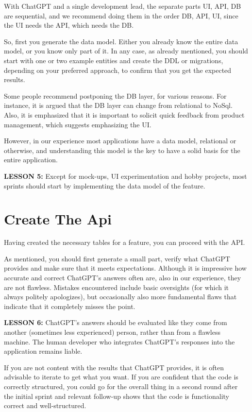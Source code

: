 \documentclass[runningheads]{llncs}
\begin{document}
With ChatGPT and a single development lead, the separate parts UI, API, DB are sequential, and we recommend doing them in the order DB, API, UI, since the UI needs the API, which needs the DB.

So, first you generate the data model. Either you already know the entire data model, or you know only part of it. In any case, as already mentioned, you should start with one or two example entities and create the DDL or migrations, depending on your preferred approach, to confirm that you get the expected results.

Some people recommend postponing the DB layer, for various reasons. For instance, it is argued that the DB layer can change from relational to NoSql. Also, it is emphasized that it is important to solicit quick feedback from product management, which suggests emphasizing the UI.

However, in our experience most applications have a data model, relational or otherwise, and understanding this model is the key to have a solid basis for the entire application.

\textbf{LESSON 5:} Except for mock-ups, UI experimentation and hobby projects, most sprints should start by implementing the data model of the feature.

\section{Create The Api}
Having created the necessary tables for a feature, you can proceed with the API.

As mentioned, you should first generate a small part, verify what ChatGPT provides and make sure that it meets expectations. Although it is impressive how accurate and
correct ChatGPT's answers often are, also in our experience, they are not flawless. Mistakes encountered include basic oversights (for which it always politely apologizes), but occasionally also more fundamental flaws that indicate that it completely misses the point.

\textbf{LESSON 6:} ChatGPT's answers should be evaluated like they come from another (sometimes less experienced) person, rather than from a flawless machine. The human developer who integrates ChatGPT's responses into the application remains liable.

If you are not content with the results that ChatGPT provides, it is often advisable to iterate to get what you want. If you are confident that the code is correctly structured, you could go for the overall thing in a second round after the initial sprint and relevant follow-up shows that the code is functionality correct and well-structured.
\end{document}
